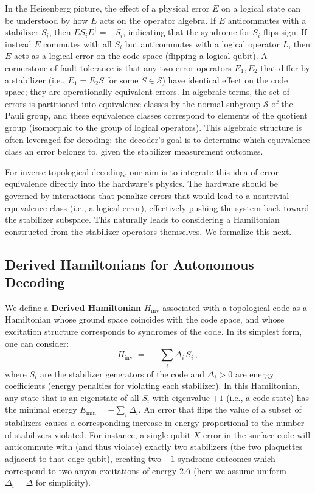 \documentclass[11pt]{article}
\begin{document}
In the Heisenberg picture, the effect of a physical error $E$ on a logical state can be understood by how $E$ acts on the operator algebra. If $E$ anticommutes with a stabilizer $S_i$, then $E S_i E^\dagger = -S_i$, indicating that the syndrome for $S_i$ flips sign. If instead $E$ commutes with all $S_i$ but anticommutes with a logical operator $\bar{L}$, then $E$ acts as a logical error on the code space (flipping a logical qubit). A cornerstone of fault-tolerance is that any two error operators $E_1, E_2$ that differ by a stabilizer (i.e., $E_1 = E_2 S$ for some $S \in \mathcal{S}$) have identical effect on the code space; they are operationally equivalent errors. In algebraic terms, the set of errors is partitioned into equivalence classes by the normal subgroup $\mathcal{S}$ of the Pauli group, and these equivalence classes correspond to elements of the quotient group (isomorphic to the group of logical operators). This algebraic structure is often leveraged for decoding: the decoder's goal is to determine which equivalence class an error belongs to, given the stabilizer measurement outcomes.

For inverse topological decoding, our aim is to integrate this idea of error equivalence directly into the hardware's physics. The hardware should be governed by interactions that penalize errors that would lead to a nontrivial equivalence class (i.e., a logical error), effectively pushing the system back toward the stabilizer subspace. This naturally leads to considering a Hamiltonian constructed from the stabilizer operators themselves. We formalize this next.

\subsection{Derived Hamiltonians for Autonomous Decoding}
We define a \textbf{Derived Hamiltonian} $H_{\mathrm{inv}}$ associated with a topological code as a Hamiltonian whose ground space coincides with the code space, and whose excitation structure corresponds to syndromes of the code. In its simplest form, one can consider:
\begin{equation} \label{eq:Ham}
    H_{\mathrm{inv}} \;=\; - \sum_{i} \Delta_i \, S_i \,,
\end{equation}
where $S_i$ are the stabilizer generators of the code and $\Delta_i > 0$ are energy coefficients (energy penalties for violating each stabilizer). In this Hamiltonian, any state that is an eigenstate of all $S_i$ with eigenvalue $+1$ (i.e., a code state) has the minimal energy $E_{\min} = -\sum_i \Delta_i$. An error that flips the value of a subset of stabilizers causes a corresponding increase in energy proportional to the number of stabilizers violated. For instance, a single-qubit $X$ error in the surface code will anticommute with (and thus violate) exactly two stabilizers (the two plaquettes adjacent to that edge qubit), creating two $-1$ syndrome outcomes which correspond to two anyon excitations of energy $2\Delta$ (here we assume uniform $\Delta_i=\Delta$ for simplicity).
\end{document}
